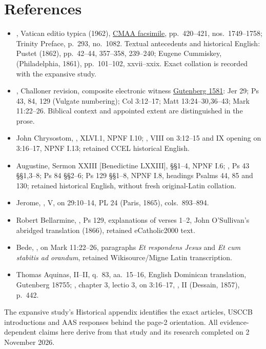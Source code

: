 \section{References}
\begin{itemize}
\item {}, Vatican editio typica (1962),
\href{https://media.churchmusicassociation.org/pdf/missale62.pdf}{CMAA
facsimile}, pp.~420--421, nos.~1749--1758; Trinity Preface, p.~293,
no.~1082. Textual antecedents and historical English: Pustet (1862),
pp.~42--44, 357--358, 239--240; Eugene Cummiskey, 
(Philadelphia, 1861), pp.~101--102, xxvii--xxix. Exact collation is
recorded with the expansive study.
\item {}, Challoner revision, composite
electronic witness \href{https://www.gutenberg.org/ebooks/1581}{Gutenberg
1581}: Jer 29; Ps 43, 84, 129 (Vulgate numbering); Col 3:12--17;
Matt 13:24--30,36--43; Mark 11:22--26. Biblical context and appointed
extent are distinguished in the prose.
\item John Chrysostom, , XLVI.1, NPNF I.10;
, VIII on 3:12--15 and IX opening on
3:16--17, NPNF I.13; retained CCEL historical English.
\item Augustine, Sermon XXIII [Benedictine LXXIII], §§1--4, NPNF I.6;
, Ps 43 §§1,3--8; Ps 84 §§2--6;
Ps 129 §§1--8, NPNF I.8, headings Psalms 44, 85 and 130;
retained historical English, without fresh original-Latin collation.
\item Jerome, , V, on 29:10--14,
PL 24 (Paris, 1865), cols.~893--894.
\item Robert Bellarmine, ,
Ps 129, explanations of verses 1--2, John O'Sullivan's abridged
translation (1866), retained eCatholic2000 text.
\item Bede, , on Mark 11:22--26,
paragraphs \textit{Et respondens Jesus} and \textit{Et cum stabitis ad
orandum}, retained Wikisource/Migne Latin transcription.
\item Thomas Aquinas,  II--II, q.~83,
aa.~15--16, English Dominican translation, Gutenberg 18755;
, chapter 3, lectio 3, on 3:16--17,
, II (Dessain, 1857), p.~442.
\end{itemize}
The expansive study's Historical appendix identifies the exact
 articles, USCCB introductions and AAS
responses behind the page-2 orientation. All evidence-dependent claims
here derive from that study and its research completed on 2 November 2026.

